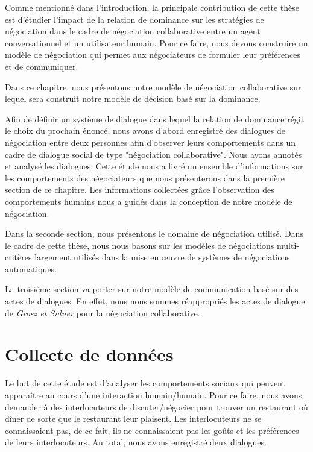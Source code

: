 	
	Comme mentionné dans l'introduction, la principale contribution de cette thèse est d'étudier l'impact de la relation de dominance sur les stratégies de négociation dans le cadre de négociation collaborative entre un agent conversationnel et un utilisateur humain. 
	Pour ce faire, nous devons construire un modèle de négociation qui permet aux négociateurs de formuler leur préférences et de communiquer. 
	
	Dans ce chapitre, nous présentons notre modèle de négociation collaborative sur lequel sera construit notre modèle de décision basé sur la dominance. 
	
	Afin de définir un système de dialogue dans lequel la relation de dominance régit le choix du prochain énoncé, nous avons d'abord enregistré des dialogues de négociation entre deux personnes afin d'observer leurs comportements dans un cadre de dialogue social de type "négociation collaborative". Nous avons annotés et analysé les dialogues. Cette étude nous a livré un ensemble d'informations sur les comportements des négociateurs que nous présenterons dans la première section de ce chapitre. 
	Les informations collectées grâce l'observation des comportements humains nous a guidés dans la conception de notre modèle de négociation.
	
	Dans la seconde section, nous présentons le domaine de négociation utilisé. Dans le cadre de cette thèse, nous nous basons sur les modèles de négociations multi-critères largement utilisés dans la mise en œuvre de systèmes de négociations automatiques. 
	
	La troisième section va porter sur notre modèle de communication basé sur des actes de dialogues. En effet, nous nous sommes réappropriés les actes de dialogue de \emph{Grosz et Sidner} \cite{grosz1986attention} pour la négociation collaborative.
	
	
	 \section{Collecte de données}
	
		
		Le but de cette étude est d'analyser les comportements sociaux qui peuvent apparaître au cours d'une interaction humain/humain.
		Pour ce faire, nous avons demander à des interlocuteurs de discuter/négocier pour trouver un restaurant où dîner de sorte que le restaurant leur plaisent.
		Les interlocuteurs ne se connaissaient pas, de ce fait, ils ne connaissaient pas les goûts et les préférences de leurs interlocuteurs. Au total, nous avons enregistré deux dialogues.
		 	

